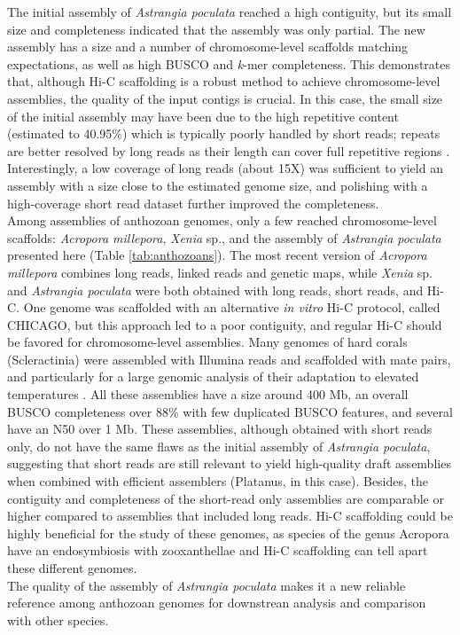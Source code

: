 The initial assembly of \textit{Astrangia poculata} reached a high contiguity, but its small size and completeness indicated that the assembly was only partial. The new assembly has a size and a number of chromosome-level scaffolds matching expectations, as well as high BUSCO and \textit{k}-mer completeness. This demonstrates that, although Hi-C scaffolding is a robust method to achieve chromosome-level assemblies, the quality of the input contigs is crucial. In this case, the small size of the initial assembly may have been due to the high repetitive content (estimated to 40.95\%) which is typically poorly handled by short reads; repeats are better resolved by long reads as their length can cover full repetitive regions \cite{pollard2018}. Interestingly, a low coverage of long reads (about 15X) was sufficient to yield an assembly with a size close to the estimated genome size, and polishing with a high-coverage short read dataset further improved the completeness. \\
Among assemblies of anthozoan genomes, only a few reached chromosome-level scaffolds: \textit{Acropora millepora}, \textit{Xenia} sp., and the assembly of \textit{Astrangia poculata} presented here (Table \ref{tab:anthozoans}). The most recent version of \textit{Acropora millepora} combines long reads, linked reads and genetic maps, while \textit{Xenia} sp. and \textit{Astrangia poculata} were both obtained with long reads, short reads, and Hi-C. One genome was scaffolded with an alternative \textit{in vitro} Hi-C protocol, called CHICAGO, but this approach led to a poor contiguity, and regular Hi-C should be favored for chromosome-level assemblies. Many genomes of hard corals (Scleractinia) were assembled with Illumina reads and scaffolded with mate pairs, and particularly for a large genomic analysis of their adaptation to elevated temperatures \cite{acropora_digitifera2}. All these assemblies have a size around 400 Mb, an overall BUSCO completeness over 88\% with few duplicated BUSCO features, and several have an N50 over 1 Mb. These assemblies, although obtained with short reads only, do not have the same flaws as the initial assembly of \textit{Astrangia poculata}, suggesting that short reads are still relevant to yield high-quality draft assemblies when combined with efficient assemblers (Platanus, in this case). Besides, the contiguity and completeness of the short-read only assemblies are comparable or higher compared to assemblies that included long reads. Hi-C scaffolding could be highly beneficial for the study of these genomes, as species of the genus Acropora have an endosymbiosis with zooxanthellae and Hi-C scaffolding can tell apart these different genomes. \\
The quality of the assembly of \textit{Astrangia poculata} makes it a new reliable reference among anthozoan genomes for downstrean analysis and comparison with other species. \\

